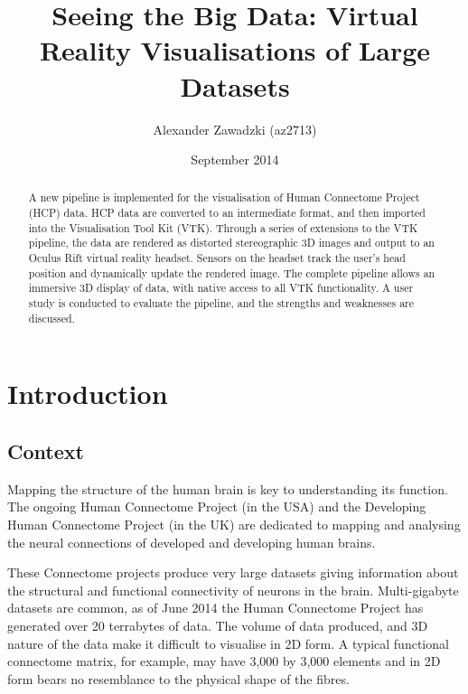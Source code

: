 \documentclass[MSc,paper=a4,pagesize=auto]{icldt}
\title{Seeing the Big Data: Virtual Reality Visualisations of Large Datasets}
\author{Alexander Zawadzki (az2713)}
\date{September 2014}
\begin{document}
\maketitle

\begin{abstract}
A new pipeline is implemented for the visualisation of Human Connectome Project (HCP) data. HCP data are converted to an intermediate format, and then imported into the Visualisation Tool Kit (VTK). Through a series of extensions to the VTK pipeline, the data are rendered as distorted stereographic 3D images and output to an Oculus Rift virtual reality headset. Sensors on the headset track the user's head position and dynamically update the rendered image. The complete pipeline allows an immersive 3D display of data, with native access to all VTK functionality. A user study is conducted to evaluate the pipeline, and the strengths and weaknesses are discussed.


\end{abstract}

\makededication
\tableofcontents

\listoftables
\listoffigures


\chapter{Introduction}
\section{Context}
Mapping the structure of the human brain is key to understanding its function. The ongoing Human Connectome Project (in the USA) and the Developing Human Connectome Project (in the UK) are dedicated to mapping and analysing the neural connections of developed and developing human brains. 

These Connectome projects produce very large datasets giving information about the structural and functional connectivity of neurons in the brain. Multi-gigabyte datasets are common, as of June 2014 the Human Connectome Project has generated over 20 terrabytes of data. The volume of data produced, and 3D nature of the data make it difficult to visualise in 2D form. A typical functional connectome matrix, for example, may have 3,000 by 3,000 elements and in 2D form bears no resemblance to the physical shape of the fibres.
\end{document}
